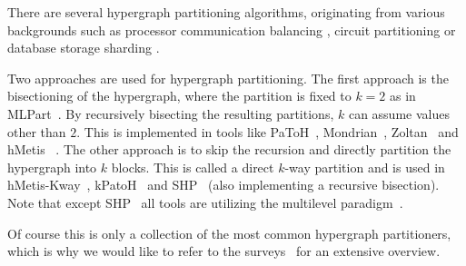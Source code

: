 \documentclass[a4paper,12pt,titlepage, BCOR7mm,headsepline]{scrbook}
\numberwithin{equation}{section}
\begin{document}

There are several hypergraph partitioning algorithms, originating from various backgrounds such as processor communication balancing \cite{catalyurek1999hypergraph}, circuit partitioning \cite{alpert1998multilevel} or database storage sharding \cite{kabiljo2017social}.

Two approaches are used for hypergraph partitioning. The first approach is the bisectioning of the hypergraph, where the partition is fixed to $k=2$ as in MLPart~\cite{alpert1998multilevel}. By recursively bisecting the resulting partitions, $k$ can assume values other than $2$. This is implemented in tools like PaToH~\cite{catalyurek1999hypergraph}, Mondrian~\cite{vastenhouw2005two}, Zoltan~\cite{devine2006parallel} and hMetis~\cite{karypis1999multilevel}%
. The other approach is to skip the recursion and directly partition the hypergraph into $k$ blocks. This is called a direct $k$-way partition and is used in hMetis-Kway~\cite{karypis2000multilevel}, kPatoH~\cite{aykanat2008multi} and SHP~\cite{kabiljo2017social} (also implementing a recursive bisection). Note that except SHP~\cite{kabiljo2017social} all tools are utilizing the multilevel paradigm~\cite{bulucc2016recent}. 

Of course this is only a collection of the most common hypergraph partitioners, which is why we would like to refer to the %
surveys~\cite{alpert1995recent,bader2013graph,papa2007hypergraph,trifunovic2006parallel} for an extensive overview.




\end{document}
